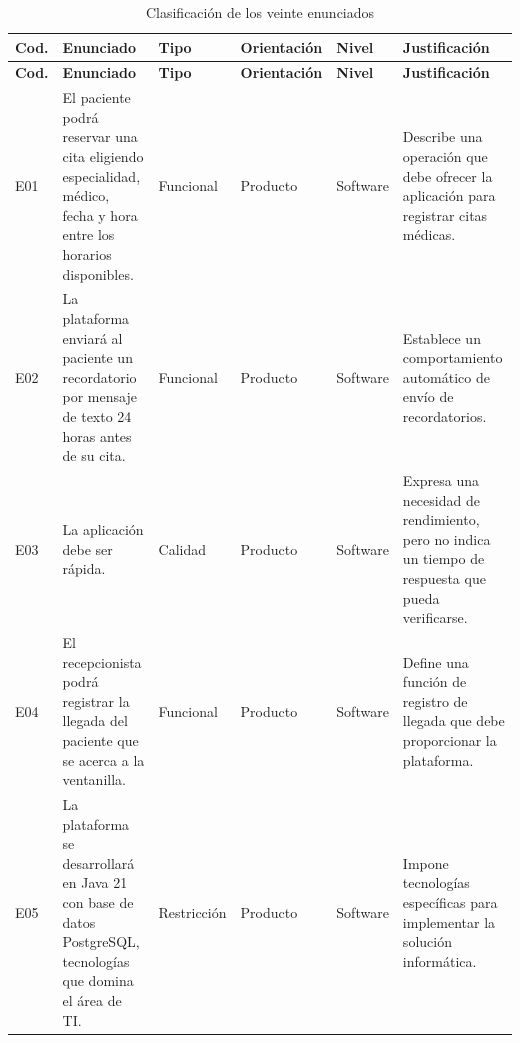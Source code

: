 \documentclass[12pt,a4paper]{article}
\begin{document}
\begin{landscape}

\footnotesize

\begin{longtable}{
P{0.8cm}
P{8.6cm}
P{2.5cm}
P{1.6cm}
P{1.6cm}
P{9.0cm}
}

\caption{Clasificación de los veinte enunciados}\\

\toprule

\textbf{Cod.} &
\textbf{Enunciado} &
\textbf{Tipo} &
\textbf{Orientación} &
\textbf{Nivel} &
\textbf{Justificación}\\

\midrule
\endfirsthead

\toprule

\textbf{Cod.} &
\textbf{Enunciado} &
\textbf{Tipo} &
\textbf{Orientación} &
\textbf{Nivel} &
\textbf{Justificación}\\

\midrule
\endhead

E01 &
El paciente podrá reservar una cita eligiendo
especialidad, médico, fecha y hora entre los
horarios disponibles. &
Funcional &
Producto &
Software &
Describe una operación que debe ofrecer
la aplicación para registrar citas médicas.\\

\midrule

E02 &
La plataforma enviará al paciente un
recordatorio por mensaje de texto 24 horas
antes de su cita. &
Funcional &
Producto &
Software &
Establece un comportamiento automático
de envío de recordatorios.\\

\midrule

E03 &
La aplicación debe ser rápida. &
Calidad &
Producto &
Software &
Expresa una necesidad de rendimiento,
pero no indica un tiempo de respuesta
que pueda verificarse.\\

\midrule

E04 &
El recepcionista podrá registrar la llegada
del paciente que se acerca a la ventanilla. &
Funcional &
Producto &
Software &
Define una función de registro de llegada
que debe proporcionar la plataforma.\\

\midrule

E05 &
La plataforma se desarrollará en Java 21
con base de datos PostgreSQL, tecnologías
que domina el área de TI. &
Restricción &
Producto &
Software &
Impone tecnologías específicas para
implementar la solución informática.\\


\end{longtable}
\end{landscape}
\end{document}
